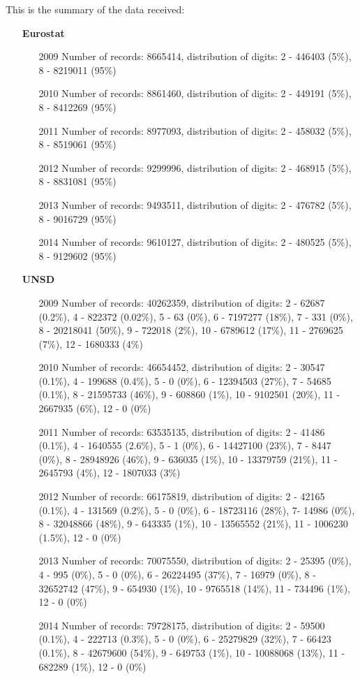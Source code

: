 \documentclass[nojss]{jss}\usepackage[]{graphicx}\usepackage[]{color}
\begin{document}
This is the summary of the data received:
\begin{itemize}
\item[\bf{Eurostat}]
\begin{itemize}
\item[2009] Number of records: 8665414, distribution of digits: 2 - 446403 (5\%), 8 - 8219011 (95\%)
\item[2010] Number of records: 8861460, distribution of digits: 2 - 449191 (5\%), 8 - 8412269 (95\%)
\item[2011] Number of records: 8977093, distribution of digits: 2 - 458032 (5\%), 8 - 8519061 (95\%)
\item[2012] Number of records: 9299996, distribution of digits: 2 - 468915 (5\%), 8 - 8831081 (95\%)
\item[2013] Number of records: 9493511, distribution of digits: 2 - 476782 (5\%), 8 - 9016729 (95\%)
\item[2014] Number of records: 9610127, distribution of digits: 2 - 480525 (5\%), 8 - 9129602 (95\%)
\end{itemize}
\item[\bf{UNSD}]
\begin{itemize}
\item[2009] Number of records: 40262359, distribution of digits: 2 - 62687 (0.2\%), 4 - 822372 (0.02\%), 5 - 63 (0\%), 6 - 7197277 (18\%), 7 - 331 (0\%), 8 - 20218041 (50\%), 9 - 722018 (2\%), 10 - 6789612 (17\%), 11 - 2769625 (7\%), 12 - 1680333 (4\%)
\item[2010] Number of records: 46654452, distribution of digits: 2 - 30547 (0.1\%), 4 - 199688 (0.4\%), 5 - 0 (0\%), 6 - 12394503 (27\%), 7 - 54685 (0.1\%), 8 - 21595733 (46\%), 9 - 608860 (1\%), 10 - 9102501 (20\%), 11 - 2667935 (6\%), 12 - 0 (0\%)
\item[2011] Number of records: 63535135, distribution of digits: 2 - 41486 (0.1\%), 4 - 1640555 (2.6\%), 5 - 1 (0\%), 6 - 14427100 (23\%), 7 - 8447 (0\%), 8 - 28948926 (46\%), 9 - 636035 (1\%), 10 - 13379759 (21\%), 11 - 2645793 (4\%), 12 - 1807033 (3\%)
\item[2012] Number of records: 66175819, distribution of digits: 2 - 42165 (0.1\%), 4 - 131569 (0.2\%), 5 - 0 (0\%), 6 - 18723116 (28\%),  7- 14986 (0\%), 8 - 32048866 (48\%), 9 - 643335 (1\%), 10 - 13565552 (21\%), 11 - 1006230 (1.5\%), 12 - 0 (0\%)
\item[2013] Number of records: 70075550, distribution of digits: 2 - 25395 (0\%), 4 - 995 (0\%), 5 - 0 (0\%), 6 - 26224495 (37\%), 7 - 16979 (0\%), 8 - 32652742 (47\%), 9 - 654930 (1\%), 10 - 9765518 (14\%), 11 - 734496 (1\%), 12 - 0 (0\%)
\item[2014] Number of records: 79728175, distribution of digits: 2 - 59500 (0.1\%), 4 - 222713 (0.3\%), 5 - 0 (0\%), 6 - 25279829 (32\%), 7 - 66423 (0.1\%), 8 - 42679600 (54\%), 9 - 649753 (1\%), 10 - 10088068 (13\%), 11 - 682289 (1\%), 12 - 0 (0\%)
\end{itemize}
\end{itemize}
\end{document}
